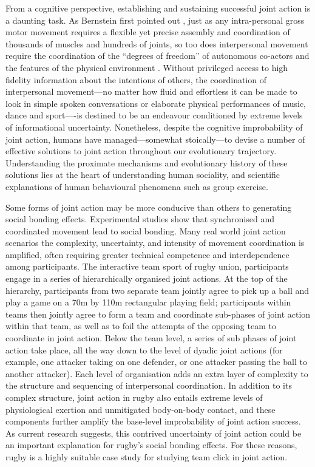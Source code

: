 \begin{CJK}{UTF8}{gbsn}
From a cognitive perspective, establishing and sustaining successful joint action is a daunting task.  As Bernstein first pointed out \textcite{Bernstein1967}, just as any intra-personal gross motor movement requires a flexible yet precise assembly and coordination of thousands of muscles and hundreds of joints, so too does interpersonal movement require the coordination of the ``degrees of freedom'' of autonomous co-actors and the features of the physical environment \cite{Riley2011}.  Without privileged access to high fidelity information about the intentions of others, the coordination of interpersonal movement---no matter how fluid and effortless it can be made to look in simple spoken conversations or elaborate physical performances of music, dance and sport----is destined to be an endeavour conditioned by extreme levels of informational uncertainty.  Nonetheless, despite the cognitive improbability of joint action, humans have managed---somewhat stoically---to devise a number of effective solutions to joint action throughout our evolutionary trajectory.  Understanding the proximate mechanisms and evolutionary history of these solutions lies at the heart of understanding human sociality, and scientific explanations of human behavioural phenomena such as group exercise.

Some forms of joint action may be more conducive than others to generating social bonding effects. Experimental studies show that synchronised and coordinated movement lead to social bonding.  Many real world joint action scenarios the complexity, uncertainty, and intensity of movement coordination is amplified, often requiring greater technical competence and interdependence among participants.
The interactive team sport of rugby union, participants engage in a series of hierarchically organised joint actions. At the top of the hierarchy, participants from two separate team jointly agree to pick up a ball and play a game on a 70m by 110m rectangular playing field; participants within teams then jointly agree to form a team and coordinate sub-phases of joint action within that team, as well as to foil the attempts of the opposing team to coordinate in joint action.  Below the team level, a series of sub phases of joint action take place, all the way down to the level of dyadic joint actions (for example, one attacker taking on one defender, or one attacker passing the ball to another attacker). Each level of organisation adds an extra layer of complexity to the structure and sequencing of interpersonal coordination.  In addition to its complex structure, joint action in rugby also entails extreme levels of physiological exertion and unmitigated body-on-body contact, and these components further amplify the base-level improbability of joint action success.  As current research suggests, this contrived uncertainty of joint action could be an important explanation for rugby's social bonding effects.  For these reasons, rugby is a highly suitable case study for studying team click in joint action.


\end{CJK}
